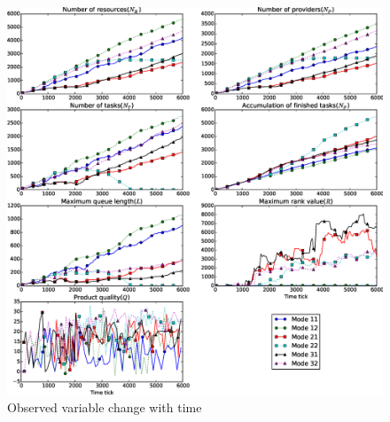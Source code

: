 \begin{figure}[htbp]
    \centering
    \includegraphics[width=\textwidth]{Data/out.eps}
    \caption{Observed variable change with time}
    \label{fig:out}
\end{figure}
